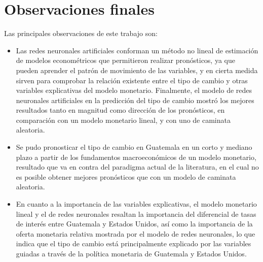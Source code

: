 \section{Observaciones finales}

Las principales observaciones de este trabajo son: 

\begin{itemize}
	
	\item Las redes neuronales artificiales conforman un método no lineal de estimación de modelos econométricos que permitieron realizar pronósticos, ya que pueden aprender el patrón de movimiento de las variables, y en cierta medida sirven para comprobar la relación existente entre el tipo de cambio y otras variables explicativas del modelo monetario. Finalmente, el modelo de redes neuronales artificiales en la predicción del tipo de cambio mostró los mejores resultados tanto en magnitud como dirección de los pronósticos, en comparación con un modelo monetario lineal, y con uno de caminata aleatoria.
	
	\item Se pudo pronosticar el tipo de cambio en Guatemala en un corto y mediano plazo a partir de los fundamentos macroeconómicos de un modelo monetario, resultado que va en contra del paradigma actual de la literatura, en el cual no es posible obtener mejores pronósticos que con un modelo de caminata aleatoria.
	
	\item En cuanto a la importancia de las variables explicativas, el modelo monetario lineal y el de redes neuronales resaltan la importancia del diferencial de tasas de interés entre Guatemala y Estados Unidos, así como la importancia de la oferta monetaria relativa mostrada por el modelo de redes neuronales, lo que indica que el tipo de cambio está principalmente explicado por las variables  guiadas a través de la política monetaria de Guatemala y Estados Unidos.
\end{itemize}
